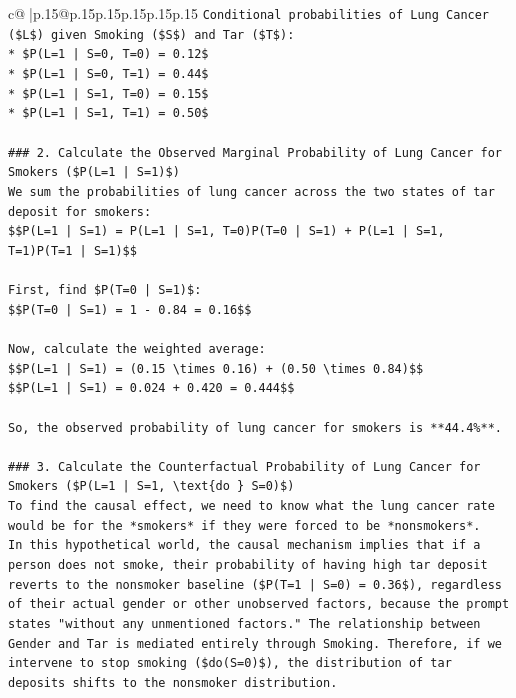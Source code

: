 \documentclass{article}
\begin{document}
{\begin{supertabular}{c@{$\;$}|p{.15\linewidth}@{}p{.15\linewidth}p{.15\linewidth}p{.15\linewidth}p{.15\linewidth}p{.15\linewidth}}
{{{\texttt{Conditional probabilities of Lung Cancer (\$L\$) given Smoking (\$S\$) and Tar (\$T\$):} \\
\texttt{*   \$P(L=1 | S=0, T=0) = 0.12\$} \\
\texttt{*   \$P(L=1 | S=0, T=1) = 0.44\$} \\
\texttt{*   \$P(L=1 | S=1, T=0) = 0.15\$} \\
\texttt{*   \$P(L=1 | S=1, T=1) = 0.50\$} \\
\\ 
\texttt{\#\#\# 2. Calculate the Observed Marginal Probability of Lung Cancer for Smokers (\$P(L=1 | S=1)\$)} \\
\texttt{We sum the probabilities of lung cancer across the two states of tar deposit for smokers:} \\
\texttt{\$\$P(L=1 | S=1) = P(L=1 | S=1, T=0)P(T=0 | S=1) + P(L=1 | S=1, T=1)P(T=1 | S=1)\$\$} \\
\\ 
\texttt{First, find \$P(T=0 | S=1)\$:} \\
\texttt{\$\$P(T=0 | S=1) = 1 {-} 0.84 = 0.16\$\$} \\
\\ 
\texttt{Now, calculate the weighted average:} \\
\texttt{\$\$P(L=1 | S=1) = (0.15 \textbackslash{}times 0.16) + (0.50 \textbackslash{}times 0.84)\$\$} \\
\texttt{\$\$P(L=1 | S=1) = 0.024 + 0.420 = 0.444\$\$} \\
\\ 
\texttt{So, the observed probability of lung cancer for smokers is **44.4\%**.} \\
\\ 
\texttt{\#\#\# 3. Calculate the Counterfactual Probability of Lung Cancer for Smokers (\$P(L=1 | S=1, \textbackslash{}text\{do \} S=0)\$)} \\
\texttt{To find the causal effect, we need to know what the lung cancer rate would be for the *smokers* if they were forced to be *nonsmokers*.} \\
\texttt{In this hypothetical world, the causal mechanism implies that if a person does not smoke, their probability of having high tar deposit reverts to the nonsmoker baseline (\$P(T=1 | S=0) = 0.36\$), regardless of their actual gender or other unobserved factors, because the prompt states "without any unmentioned factors." The relationship between Gender and Tar is mediated entirely through Smoking. Therefore, if we intervene to stop smoking (\$do(S=0)\$), the distribution of tar deposits shifts to the nonsmoker distribution.} \\
}}}
\end{supertabular}}
\end{document}
